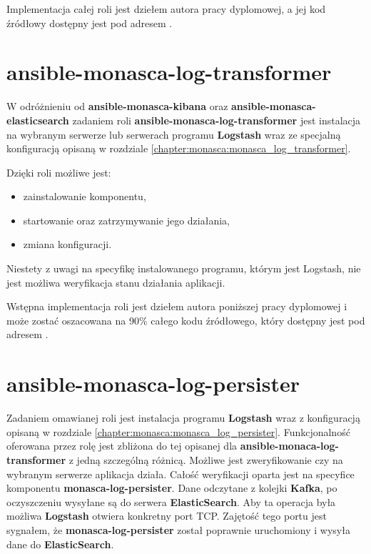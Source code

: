     Implementacja całej roli jest dziełem autora pracy dyplomowej, a jej kod źródłowy dostępny
    jest pod adresem .

\section{ansible-monasca-log-transformer}
\label{chapter:application:own_work:ansible_log_transformer}

    W odróżnieniu od \textbf{ansible-monasca-kibana} oraz \textbf{ansible-monasca-elasticsearch} zadaniem roli
    \textbf{ansible-monasca-log-transformer} jest instalacja na wybranym serwerze lub serwerach programu
    \textbf{Logstash} wraz ze specjalną konfiguracją opisaną w rozdziale \ref{chapter:monasca:monasca_log_transformer}.
    
    Dzięki roli możliwe jest:
    \begin{itemize}
        \item zainstalowanie komponentu,
        \item startowanie oraz zatrzymywanie jego działania,
        \item zmiana konfiguracji.
    \end{itemize}
    
    Niestety z uwagi na specyfikę instalowanego programu, którym jest Logstash, nie jest możliwa weryfikacja stanu
    działania aplikacji.
    
    Wstępna implementacja roli jest dziełem autora poniższej pracy dyplomowej i może zostać oszacowana na 90\% całego
    kodu źródłowego, który dostępny jest pod adresem
    .

\section{ansible-monasca-log-persister}
\label{chapter:application:own_work:ansible_log_persister}

    Zadaniem omawianej roli jest instalacja programu \textbf{Logstash} wraz z konfiguracją opisaną
    w rozdziale \ref{chapter:monasca:monasca_log_persister}. Funkcjonalność oferowana przez rolę jest
    zbliżona do tej opisanej dla \textbf{ansible-monaca-log-transformer} z jedną szczególną różnicą.
    Możliwe jest zweryfikowanie czy na wybranym serwerze aplikacja działa. Całość weryfikacji oparta jest
    na specyfice komponentu \textbf{monasca-log-persister}. Dane odczytane z kolejki \textbf{Kafka}, po oczyszczeniu
    wysyłane są do serwera \textbf{ElasticSearch}. Aby ta operacja była możliwa \textbf{Logstash} otwiera konkretny
    port TCP. Zajętość tego portu jest sygnałem, że \textbf{monasca-log-persister} został poprawnie uruchomiony i wysyła
    dane do \textbf{ElasticSearch}.

